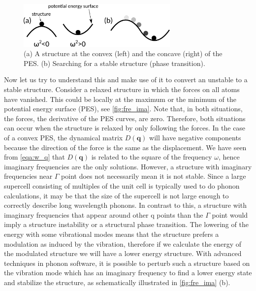 \begin{figure}[htb] 
\centering  
\includegraphics[width=0.7\textwidth]{fre_ima.eps}
\caption[A structure at the convex and the concave of the PES]{ (a) A structure at the convex (left) and the concave (right) of the PES. (b) Searching for a stable structure (phase transition).}  
\label{fig:fre_ima}
\end{figure} 

Now let us try to understand this and make use of it to convert an unstable to a stable structure. Consider a relaxed structure in which the forces on all atoms have vanished. This could be locally at the maximum or the minimum of the potential energy surface (PES), see \autoref{fig:fre_ima}. Note that, in both situations, the forces, the derivative of the PES curves, are zero. Therefore, both situations can occur when the structure is relaxed by only following the forces. In the case of a convex PES, the dynamical matrix $D(\mathbf{q})$ will have negative components because the direction of the force is the same as the displacement. We have seen from \autoref{eqa:w_q} that $D(\mathbf{q})$ is related to the square of the frequency $\omega$, hence imaginary frequencies are the only solutions. However, a structure with imaginary frequencies near $\Gamma$ point does not necessarily mean it is not stable. Since a large supercell consisting of multiples of the unit cell is typically used to do phonon calculations, it may be that the size of the supercell is not large enough to correctly describe long wavelength phonons. In contrast to this, a structure with imaginary frequencies that appear around other q points than the $\Gamma$ point would imply a structure instability or a structural phase transition. The lowering of the energy with some vibrational modes means that the structure prefers a modulation as induced by the vibration, therefore if we calculate the energy of the modulated structure we will have a lower energy structure. With advanced techniques in phonon software\cite[e.g.][]{phonopya}, it is possible to perturb such a structure based on the vibration mode which has an imaginary frequency to find a lower energy state and stabilize the structure, as schematically illustrated in \autoref{fig:fre_ima} (b). 




